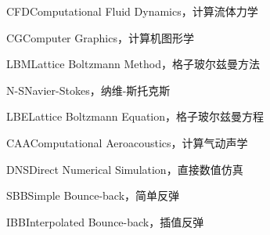 
\begin{nomenclatures}[缩写]
  \item{CFD}{Computational Fluid Dynamics，计算流体力学}
  \item{CG}{Computer Graphics，计算机图形学}
  \item{LBM}{Lattice Boltzmann Method，格子玻尔兹曼方法}
  \item{N-S}{Navier-Stokes，纳维-斯托克斯}
  \item{LBE}{Lattice Boltzmann Equation，格子玻尔兹曼方程}
  \item{CAA}{Computational Aeroacoustics，计算气动声学}
  \item{DNS}{Direct Numerical Simulation，直接数值仿真}
  \item{SBB}{Simple Bounce-back，简单反弹}
  \item{IBB}{Interpolated Bounce-back，插值反弹}
\end{nomenclatures}

